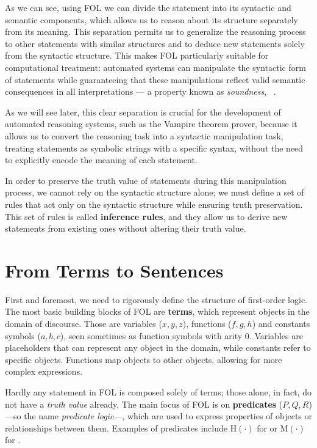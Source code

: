 As we can see, using FOL we can divide the statement into its syntactic and semantic components, which allows us to reason about its structure separately from its meaning.
This separation permits us to generalize the reasoning process to other statements with similar structures and to deduce new statements solely from the syntactic structure.
This makes FOL particularly suitable for computational treatment: automated systems can manipulate the syntactic form of statements while guaranteeing that these manipulations reflect valid semantic consequences in all interpretations — a property known as \textit{soundness}, \citeauthor{enderton2001}~\cite{enderton2001}.

As we will see later, this clear separation is crucial for the development of automated reasoning systems, such as the Vampire theorem prover, because it allows us to convert the reasoning task into a syntactic manipulation task, treating statements as symbolic strings with a specific syntax, without the need to explicitly encode the meaning of each statement.

In order to preserve the truth value of statements during this manipulation process, we cannot rely on the syntactic structure alone; we must define a set of rules that act only on the syntactic structure while ensuring truth preservation.
This set of rules is called \textbf{inference rules}, and they allow us to derive new statements from existing ones without altering their truth value.
\section{From Terms to Sentences}

First and foremost, we need to rigorously define the structure of first-order logic.
The most basic building blocks of FOL are \textbf{terms}, which represent objects in the domain of discourse.
Those are variables (\(x,y,z\)), functions (\(f,g,h\)) and constants symbols (\(a,b,c\)), seen sometimes as function symbols with arity 0.
Variables are placeholders that can represent any object in the domain, while constants refer to specific objects. Functions map objects to other objects, allowing for more complex expressions.

Hardly any statement in FOL is composed solely of terms; those alone, in fact, do not have a \textit{truth value} already.
The main focus of FOL is on \textbf{predicates} (\(P,Q,R\)) ---so the name \textit{predicate logic}---, which are used to express properties of objects or relationships between them.
Examples of predicates include \(\text{H}(\cdot)\) for  or \(\text{M}(\cdot)\) for .


